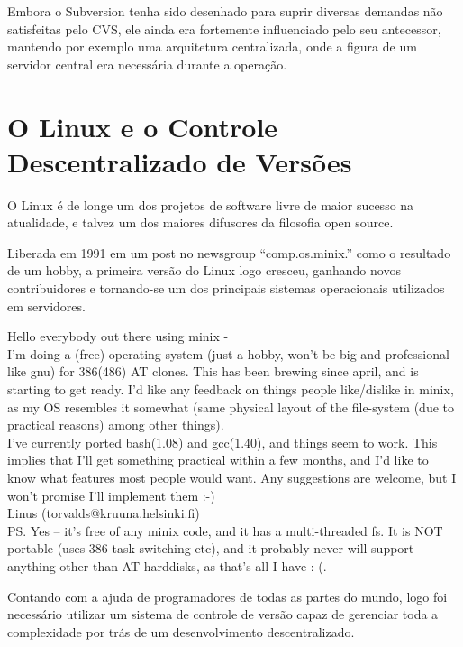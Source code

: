 Embora o Subversion tenha sido desenhado para suprir diversas demandas
não satisfeitas pelo CVS, ele ainda era fortemente influenciado pelo seu
antecessor, mantendo por exemplo uma arquitetura centralizada, onde a
figura de um servidor central era necessária durante a operação.

\section{O Linux e o Controle Descentralizado de Versões}

O Linux é de longe um dos projetos de software livre de maior sucesso na
atualidade, e talvez um dos maiores difusores da filosofia open source.

Liberada em 1991 em um post no newsgroup ``comp.os.minix.'' como o resultado
de um hobby, a primeira versão do Linux logo cresceu, ganhando novos
contribuidores e tornando-se um dos principais sistemas operacionais utilizados
em servidores.

\begin{citacao}

Hello everybody out there using minix -\\

I'm doing a (free) operating system (just a hobby, won't be big and professional like gnu) for 386(486) AT clones. This has been brewing since april, and is starting to get ready. I'd like any feedback on things people like/dislike in minix, as my OS resembles it somewhat (same physical layout of the file-system (due to practical reasons) among other things).\\

I've currently ported bash(1.08) and gcc(1.40), and things seem to work. This implies that I'll get something practical within a few months, and I'd like to know what features most people would want. Any suggestions are welcome, but I won't promise I'll implement them :-)\\

Linus (torvalds@kruuna.helsinki.fi)\\

PS. Yes – it's free of any minix code, and it has a multi-threaded fs. It is NOT portable (uses 386 task switching etc), and it probably never will support anything other than AT-harddisks, as that's all I have :-(.\\

\cite{Torvalds}
\end{citacao}

Contando com a ajuda de programadores de todas as partes do mundo, logo
foi necessário utilizar um sistema de controle de versão capaz de gerenciar
toda a complexidade por trás de um desenvolvimento descentralizado.

